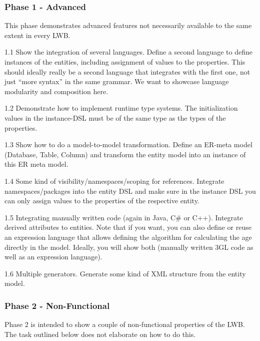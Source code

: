 \subsubsection{Phase 1 - Advanced}

This phase demonstrates advanced features not necessarily available to the same
extent in every LWB.

\begin{compactitem}
    \item 1.1 Show the integration of several languages. Define a second
    language to define instances of the entities, including assignment of values
    to the properties. This should ideally really be a second language that
    integrates with the first one, not just ``more syntax'' in the same grammar.
    We want to showcase language modularity and composition here.
    \item 1.2 Demonstrate how to implement runtime type systems. The
    initialization values in the instance-DSL must be of the same type as the
    types of the properties.
    \item 1.3 Show how to do a model-to-model transformation. Define an ER-meta
    model (Database, Table, Column) and transform the entity model into an
    instance of this ER meta model.
    \item 1.4 Some kind of visibility/namespaces/scoping for references.
    Integrate namespaces/packages into the entity DSL and make sure in the
    instance DSL you can only assign values to the properties of the respective
    entity.
    \item 1.5 Integrating manually written code (again in Java, C\# or C++).
    Integrate derived attributes to entities. Note that if you want, you can
    also define or reuse an expression language that allows defining the
    algorithm for calculating the age directly in the model. Ideally, you will
    show both (manually written 3GL code as well as an expression language).
    \item 1.6 Multiple generators. Generate some kind of XML structure from the
    entity model.
\end{compactitem}

\subsubsection{Phase 2 - Non-Functional}

Phase 2 is intended to show a couple of non-functional properties of the LWB.
The task outlined below does not elaborate on how to do this.

